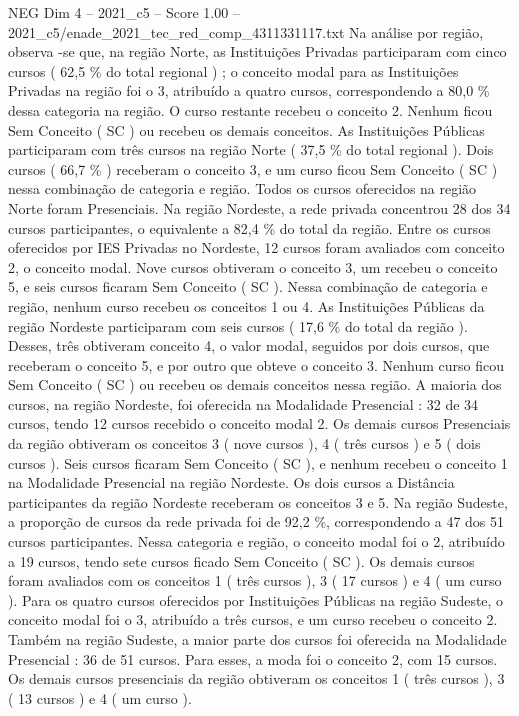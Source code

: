 \begin{textsample}{NEG Dim 4 – 2021\_c5 – Score 1.00 – 2021\_c5/enade\_2021\_tec\_red\_comp\_4311331117.txt}
Na análise por região, observa -se que, na região Norte, as Instituições Privadas participaram com cinco cursos ( 62,5 \% do total regional ) ; o conceito modal para as Instituições Privadas na região foi o 3, atribuído a quatro cursos, correspondendo a 80,0 \% dessa categoria na região.
O curso restante recebeu o conceito 2.
Nenhum ficou Sem Conceito ( SC ) ou recebeu os demais conceitos.
As Instituições Públicas participaram com três cursos na região Norte ( 37,5 \% do total regional ).
Dois cursos ( 66,7 \% ) receberam o conceito 3, e um curso ficou Sem Conceito ( SC ) nessa combinação de categoria e região.
Todos os cursos oferecidos na região Norte foram Presenciais.
Na região Nordeste, a rede privada concentrou 28 dos 34 cursos participantes, o equivalente a 82,4 \% do total da região.
Entre os cursos oferecidos por IES Privadas no Nordeste, 12 cursos foram avaliados com conceito 2, o conceito modal.
Nove cursos obtiveram o conceito 3, um recebeu o conceito 5, e seis cursos ficaram Sem Conceito ( SC ).
Nessa combinação de categoria e região, nenhum curso recebeu os conceitos 1 ou 4.
As Instituições Públicas da região Nordeste participaram com seis cursos ( 17,6 \% do total da região ).
Desses, três obtiveram conceito 4, o valor modal, seguidos por dois cursos, que receberam o conceito 5, e por outro que obteve o conceito 3.
Nenhum curso ficou Sem Conceito ( SC ) ou recebeu os demais conceitos nessa região.
A maioria dos cursos, na região Nordeste, foi oferecida na Modalidade Presencial : 32 de 34 cursos, tendo 12 cursos recebido o conceito modal 2.
Os demais cursos Presenciais da região obtiveram os conceitos 3 ( nove cursos ), 4 ( três cursos ) e 5 ( dois cursos ).
Seis cursos ficaram Sem Conceito ( SC ), e nenhum recebeu o conceito 1 na Modalidade Presencial na região Nordeste.
Os dois cursos a Distância participantes da região Nordeste receberam os conceitos 3 e 5.
Na região Sudeste, a proporção de cursos da rede privada foi de 92,2 \%, correspondendo a 47 dos 51 cursos participantes.
Nessa categoria e região, o conceito modal foi o 2, atribuído a 19 cursos, tendo sete cursos ficado Sem Conceito ( SC ).
Os demais cursos foram avaliados com os conceitos 1 ( três cursos ), 3 ( 17 cursos ) e 4 ( um curso ).
Para os quatro cursos oferecidos por Instituições Públicas na região Sudeste, o conceito modal foi o 3, atribuído a três cursos, e um curso recebeu o conceito 2.
Também na região Sudeste, a maior parte dos cursos foi oferecida na Modalidade Presencial : 36 de 51 cursos.
Para esses, a moda foi o conceito 2, com 15 cursos.
Os demais cursos presenciais da região obtiveram os conceitos 1 ( três cursos ), 3 ( 13 cursos ) e 4 ( um curso ).

\end{textsample}
